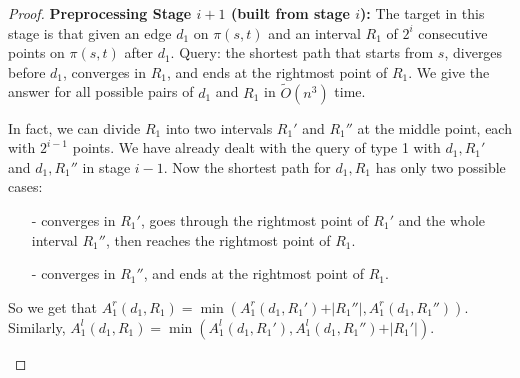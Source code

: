 \documentclass[11pt]{article}
\theoremstyle{plain}
\theoremstyle{definition}
\newcommand{\too}[1]{\tilde{O}({#1})}
\newcommand{\abs}[1]{\vert{#1}\vert}
\begin{document}
\begin{proof}
\noindent\textbf{Preprocessing Stage $i+1$ (built from stage $i$):} The target in this stage is that given an edge $d_1$ on $\pi(s,t)$ and an interval $R_1$ of $2^{i}$ consecutive points on $\pi(s,t)$ after $d_1.$ Query: the shortest path that starts from $s$, diverges before $d_1$, converges in $R_1$, and ends at the rightmost point of $R_1.$ We give the answer for all possible pairs of $d_1$ and $R_1$ in $\too{n^3}$ time.

In fact, we can divide $R_1$ into two intervals $R_1'$ and $R_1''$ at the middle point, each with $2^{i-1}$ points. We have already dealt with the query of type 1 with $d_1,R_1'$
and $d_1,R_1''$ in stage $i-1.$ Now the shortest path for $d_1,R_1$ has only two possible cases: 

\begin{itemize}
    \item[-] converges in $R_1'$, goes through the rightmost point of $R_1'$ and the whole interval $R_1''$, then reaches the rightmost point of $R_1.$
    \item[-] converges in $R_1''$, and ends at the rightmost point of $R_1.$
\end{itemize}

So we get that $A_1^r(d_1,R_1)=\min{\left(A_1^r(d_1,R_1')+\abs{R_1''},A_1^r(d_1,R_1'')\right)}.$ 
\newline Similarly, $A_1^l(d_1,R_1)=\min{\left(A_1^l(d_1,R_1'),A_1^l(d_1,R_1'')+\abs{R_1'}\right)}.$

\begin{center}
    


\begin{tikzpicture}[x=0.75pt,y=0.75pt,yscale=-1,xscale=1]



\end{tikzpicture}
\end{center}
\end{proof}
\end{document}
